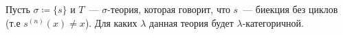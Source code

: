 Пусть $\sigma \coloneqq \{s\}$ и $T$~--- $\sigma$-теория, которая говорит, что $s$~--- биекция без циклов
(т.е $s^{(n)}(x) \neq x$). Для каких $\lambda$ данная теория будет $\lambda$-категоричной.